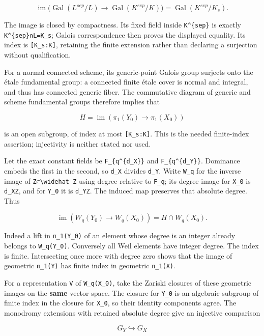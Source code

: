 \documentclass[
]{report}
\begin{document}
\[
\operatorname{im}\bigl(\operatorname{Gal}(L^{sep}/L)\to
\operatorname{Gal}(K^{sep}/K)\bigr)
=\operatorname{Gal}(K^{sep}/K_s).
\tag{DMG4.1}
\]

The image is closed by compactness. Its fixed field inside
\texttt{K\^{}\{sep\}} is exactly \texttt{K\^{}\{sep\}∩L=K\_s}; Galois
correspondence then proves the displayed equality. Its index is
\texttt{{[}K\_s:K{]}}, retaining the finite extension rather than
declaring a surjection without qualification.

For a normal connected scheme, its generic-point Galois group surjects
onto the étale fundamental group: a connected finite étale cover is
normal and integral, and thus has connected generic fiber. The
commutative diagram of generic and scheme fundamental groups therefore
implies that

\[
H=\operatorname{im}(\pi_1(Y_0)\to\pi_1(X_0))
\]

is an open subgroup, of index at most \texttt{{[}K\_s:K{]}}. This is the
needed finite-index assertion; injectivity is neither stated nor used.

Let the exact constant fields be \texttt{F\_\{q\^{}\{d\_X\}\}} and
\texttt{F\_\{q\^{}\{d\_Y\}\}}. Dominance embeds the first in the second,
so \texttt{d\_X} divides \texttt{d\_Y}. Write \texttt{W\_q} for the
inverse image of \texttt{Z⊂\textbackslash{}widehat\ Z} using degree
relative to \texttt{F\_q}; its degree image for \texttt{X\_0} is
\texttt{d\_XZ}, and for \texttt{Y\_0} it is \texttt{d\_YZ}. The induced
map preserves that absolute degree. Thus

\[
\operatorname{im}(W_q(Y_0)\to W_q(X_0))=H\cap W_q(X_0).
\tag{DMG4.2}
\]

Indeed a lift in \texttt{π\_1(Y\_0)} of an element whose degree is an
integer already belongs to \texttt{W\_q(Y\_0)}. Conversely all Weil
elements have integer degree. The index is finite. Intersecting once
more with degree zero shows that the image of geometric \texttt{π\_1(Y)}
has finite index in geometric \texttt{π\_1(X)}.

For a representation \texttt{V} of \texttt{W\_q(X\_0)}, take the Zariski
closures of these geometric images on the \textbf{same} vector space.
The closure for \texttt{Y\_0} is an algebraic subgroup of finite index
in the closure for \texttt{X\_0}, so their identity components agree.
The monodromy extensions with retained absolute degree give an injective
comparison

\[
G_Y\hookrightarrow G_X
\tag{DMG4.3}
\]
\end{document}
